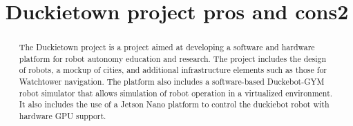 \documentclass[conference]{IEEEtran}
\begin{document}
%
\title{Duckietown project pros and cons2}

\author{


\and


\and


\and 


}

\maketitle              %

\begin{abstract}
The Duckietown project is a project aimed at developing a software and hardware platform for robot autonomy education and research. The project includes the design of robots, a mockup of cities, and additional infrastructure elements such as those for Watchtower navigation. The platform also includes a software-based Duckebot-GYM robot simulator that allows simulation of robot operation in a virtualized environment. It also includes the use of a Jetson Nano platform to control the duckiebot robot with hardware GPU support.
\end{abstract}
\end{document}
